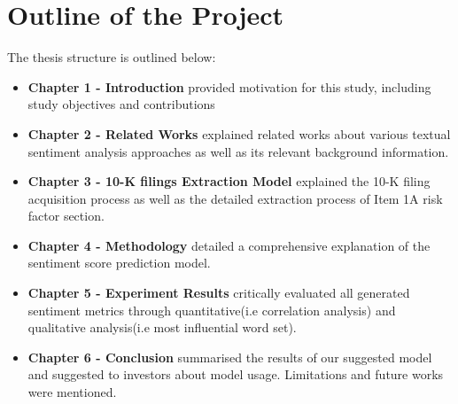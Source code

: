 \documentclass[logo,bsc,singlespacing,parskip]{infthesis}
\begin{document}

\section{Outline of the Project}
The thesis structure is outlined below:

\begin{itemize}
    \item \textbf{Chapter 1 - Introduction} provided motivation for this study, including study objectives and contributions
\end{itemize}

\begin{itemize}
    \item \textbf{Chapter 2 - Related Works} explained related works about various textual sentiment analysis approaches as well as its relevant background information.  
\end{itemize}

\begin{itemize}
    \item \textbf{Chapter 3 - 10-K filings Extraction Model} explained the 10-K filing acquisition process as well as the detailed extraction process of Item 1A risk factor section.
\end{itemize}

\begin{itemize}
    \item \textbf{Chapter 4 - Methodology} detailed a comprehensive explanation of the sentiment score prediction model.
\end{itemize}

\begin{itemize}
    \item \textbf{Chapter 5 - Experiment Results} critically evaluated all generated sentiment metrics through quantitative(i.e correlation analysis) and qualitative analysis(i.e most influential word set). 
\end{itemize}

\begin{itemize}
    \item \textbf{Chapter 6 - Conclusion} summarised the results of our suggested model and suggested to investors about model usage. Limitations and future works were mentioned.  
\end{itemize}
\end{document}
